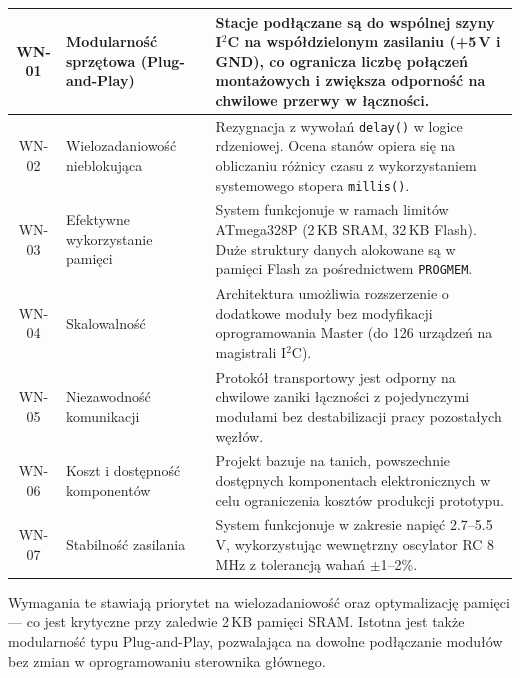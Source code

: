 \documentclass{SGGW-thesis}
\begin{document}
\begin{longtable}{|c|p{3.8cm}|p{8.2cm}|}
  WN-01          & Modularność sprzętowa (Plug-and-Play) & Stacje podłączane są do wspólnej szyny I$^2$C na współdzielonym zasilaniu (+5\,V i GND), co ogranicza liczbę połączeń montażowych i zwiększa odporność na chwilowe przerwy w łączności. \\
  \hline
  WN-02          & Wielozadaniowość nieblokująca         & Rezygnacja z wywołań \texttt{delay()} w logice rdzeniowej. Ocena stanów opiera się na obliczaniu różnicy czasu z wykorzystaniem systemowego stopera \texttt{millis()}.                    \\
  \hline
  WN-03          & Efektywne wykorzystanie pamięci       & System funkcjonuje w ramach limitów ATmega328P (2\,KB SRAM, 32\,KB Flash). Duże struktury danych alokowane są w pamięci Flash za pośrednictwem \texttt{PROGMEM}.                   \\
  \hline
  WN-04          & Skalowalność                          & Architektura umożliwia rozszerzenie o dodatkowe moduły bez modyfikacji oprogramowania Master (do 126 urządzeń na magistrali I$^2$C).                                               \\
  \hline
  WN-05          & Niezawodność komunikacji              & Protokół transportowy jest odporny na chwilowe zaniki łączności z pojedynczymi modułami bez destabilizacji pracy pozostałych węzłów.                                               \\
  \hline
  WN-06          & Koszt i dostępność komponentów        & Projekt bazuje na tanich, powszechnie dostępnych komponentach elektronicznych w celu ograniczenia kosztów produkcji prototypu.                                                     \\
  \hline
  WN-07          & Stabilność zasilania                  & System funkcjonuje w zakresie napięć 2.7--5.5\,V, wykorzystując wewnętrzny oscylator RC 8\,MHz z tolerancją wahań $\pm$1--2\%.                                                     \\
  \hline
\end{longtable}

Wymagania te stawiają priorytet na wielozadaniowość oraz optymalizację pamięci --- co jest krytyczne przy zaledwie 2\,KB pamięci SRAM. Istotna jest także modularność typu Plug-and-Play, pozwalająca na dowolne podłączanie modułów bez zmian w oprogramowaniu sterownika głównego.
\end{document}
